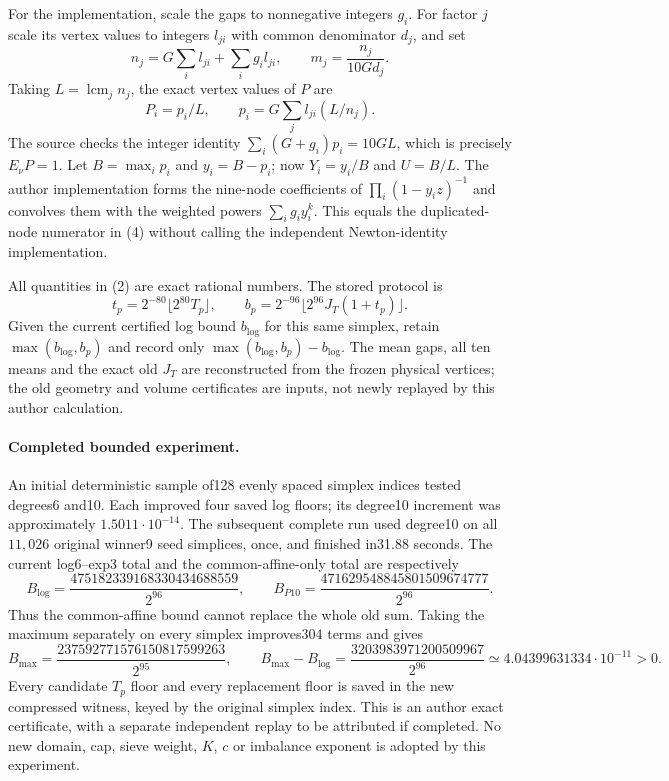 For the implementation, scale the gaps to nonnegative integers $g_i$.
For factor $j$ scale its vertex values to integers $l_{ji}$ with common
denominator $d_j$, and set
\[
 n_j=G\sum_i l_{ji}+\sum_i g_i l_{ji},\qquad
 m_j=\frac{n_j}{10Gd_j}.
\]
Taking $L=\operatorname{lcm}_j n_j$, the exact vertex values of $P$ are
\[
 P_i=p_i/L,\qquad p_i=G\sum_j l_{ji}(L/n_j).
\]
The source checks the integer identity
$\sum_i(G+g_i)p_i=10GL$, which is precisely $E_\nu P=1$.
Let $B=\max_i p_i$ and $y_i=B-p_i$; now $Y_i=y_i/B$ and $U=B/L$.
The author implementation forms the nine-node coefficients of
$\prod_i(1-y_i z)^{-1}$ and convolves them with the weighted powers
$\sum_i g_i y_i^k$. This equals the duplicated-node numerator in (4)
without calling the independent Newton-identity implementation.

All quantities in (2) are exact rational numbers. The stored protocol is
\[
 t_p=2^{-80}\lfloor2^{80}T_p\rfloor,\qquad
 b_p=2^{-96}\lfloor2^{96}J_T(1+t_p)\rfloor.
\]
Given the current certified log bound $b_{\log}$ for this same simplex,
retain $\max(b_{\log},b_p)$ and record only
$\max(b_{\log},b_p)-b_{\log}$. The mean gaps, all ten means and the
exact old $J_T$ are reconstructed from the frozen physical vertices;
the old geometry and volume certificates are inputs, not newly replayed
by this author calculation.

\paragraph{Completed bounded experiment.}
An initial deterministic sample of128 evenly spaced simplex indices
tested degrees6 and10. Each improved four saved log floors; its
degree10 increment was approximately $1.5011\cdot10^{-14}$.
The subsequent complete run used degree10 on all $11{,}026$ original
winner9 seed simplices, once, and finished in31.88 seconds.
The current log6--exp3 total and the common-affine-only total are
respectively
\[
 B_{\log}=\frac{475182339168330434688559}{2^{96}},\qquad
 B_{P10}=\frac{471629548845801509674777}{2^{96}}.
\]
Thus the common-affine bound cannot replace the whole old sum.
Taking the maximum separately on every simplex improves304 terms and
gives
\[
 B_{\max}=\frac{237592771576150817599263}{2^{95}},\qquad
 B_{\max}-B_{\log}
 =\frac{3203983971200509967}{2^{96}}
 \simeq4.04399631334\cdot10^{-11}>0.
 \tag{5}
\]
Every candidate $T_p$ floor and every replacement floor is saved in the
new compressed witness, keyed by the original simplex index. This is
an author exact certificate, with a separate independent replay to be
attributed if completed. No new domain, cap, sieve weight, $K$, $c$ or
imbalance exponent is adopted by this experiment.

